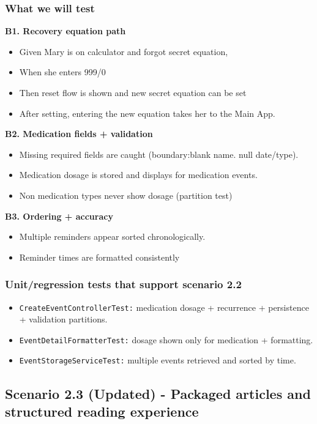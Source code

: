 \documentclass[a4paper,12pt]{article}
\begin{document}
\subsubsection{What we will test}
\textbf{B1. Recovery equation path}
\begin{itemize}
    \item Given Mary is on calculator and forgot secret equation,
    \item When she enters 999/0
    \item Then reset flow is shown and new secret equation can be set
    \item After setting, entering the new equation takes her to the Main App.
\end{itemize}
\textbf{B2. Medication fields + validation}
\begin{itemize}
    \item Missing required fields are caught (boundary:blank name. null date/type).
    \item Medication dosage is stored and displays for medication events.
    \item Non medication types never show dosage (partition test)
\end{itemize}
\textbf{B3. Ordering + accuracy}
\begin{itemize}
    \item Multiple reminders appear sorted chronologically.
    \item Reminder times are formatted consistently
\end{itemize}
\subsubsection{Unit/regression tests that support scenario 2.2}
\begin{itemize}
    \item \texttt{CreateEventControllerTest:} medication dosage + recurrence + persistence + validation partitions.
    \item \texttt{EventDetailFormatterTest:} dosage shown only for medication + formatting.
    \item \texttt{EventStorageServiceTest:} multiple events retrieved and sorted by time.
\end{itemize}

\subsection{Scenario 2.3 (Updated) - Packaged articles and structured reading experience}
\end{document}

